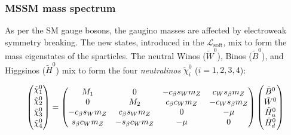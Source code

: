


			\subsubsection*{MSSM mass spectrum}

				As per the \ac{SM} gauge bosons, the gaugino masses are affected by electroweak symmetry breaking. The new states, introduced in the $\mathcal L_{\mathrm{soft}}$, mix to form the mass eigenstates of the sparticles. The neutral Winos ($\tilde{W}^0$), Binos ($\tilde{B}^0$), and Higgsinos ($\tilde{H}^0$) mix to form the four \textit{neutralinos} $\tilde{\chi}^0_i$ ($i=1,2,3,4$):

				\begin{equation}
				\label{eq:neutralino_mixing}
					\begin{pmatrix}  \ninoone \\ \ninotwo \\ \ninothree \\ \ninofour \end{pmatrix}	
					= 
					\begin{pmatrix}
						M_1 & 0 & - c_\beta s_W m_Z &  c_W s_\beta m_Z  \\
						0 & M_2 & c_\beta c_W m_Z  &  - c_W s_\beta m_Z \\
						- c_\beta s_W m_Z  & c_\beta s_W m_Z  & 0 & - \mu \\ 
						s_\beta c_W m_Z  & - s_\beta c_W m_Z & - \mu & 0  
					\end{pmatrix}
					\begin{pmatrix}
						\tilde{B}^{0} \\
						\tilde{W}^{0} \\
						\tilde{H}^{0}_u \\
						\tilde{H}^{0}_d
					\end{pmatrix}
				\end{equation}

